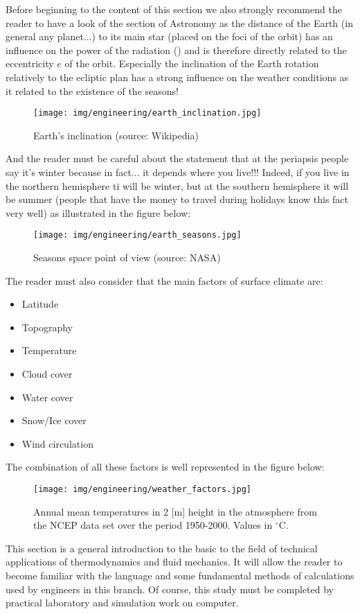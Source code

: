 	Before beginning to the content of this section we also strongly recommend the reader to have a look of the section of Astronomy as the distance of the Earth (in general any planet...) to its main star (placed on the foci of the orbit) has an influence on the power of the radiation () and is therefore directly related to the eccentricity $e$ of the orbit. Especially the inclination of the Earth rotation relatively to the ecliptic plan has a strong influence on the weather conditions as it related to the existence of the seasons!
	\begin{figure}[H]
		\centering
		\texttt{[image: img/engineering/earth\_inclination.jpg]}
		\caption[Earth's inclination]{Earth's inclination (source: Wikipedia)}
	\end{figure}
	And the reader must be careful about the statement that at the periapsis people say it's winter because in fact... it depends where you live!!! Indeed, if you live in the northern hemisphere ti will be winter, but at the southern hemisphere it will be summer (people that have the money to travel during holidays know this fact very well) as illustrated in the figure below:
	\begin{figure}[H]
		\centering
		\texttt{[image: img/engineering/earth\_seasons.jpg]}
		\caption[Seasons space point of view]{Seasons space point of view (source: NASA)}
	\end{figure}
	The reader must also consider that the main factors of surface climate are:
	\begin{itemize}
		\item Latitude
		\item Topography
		\item Temperature
		\item Cloud cover
		\item Water cover
		\item Snow/Ice cover
		\item Wind circulation
	\end{itemize}
	The combination of all these factors is well represented in the figure below:
	\begin{figure}[H]
		\centering
		\texttt{[image: img/engineering/weather\_factors.jpg]}
		\caption{Annual mean temperatures in $2$ [m] height in the atmosphere from the NCEP data set over the period 1950-2000. Values in $^\circ$C.}
	\end{figure}
	This section is a general introduction to the basic to the field of technical applications of thermodynamics and fluid mechanics. It will allow the reader to become familiar with the language and some fundamental methods of calculations used by engineers in this branch. Of course, this study must be completed by practical laboratory and simulation work on computer.
	
